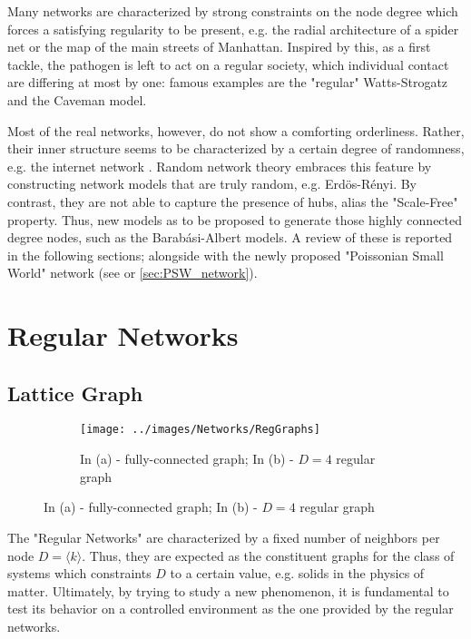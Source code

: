 \documentclass[a4paper,10pt]{book} %
\theoremstyle{definition}
\begin{document}
Many networks are characterized by strong constraints on the node degree which forces a satisfying regularity to be present, e.g. the radial architecture of a spider net or the map of the main streets of Manhattan.
Inspired by this, as a first tackle, the pathogen is left to act on a regular society, which individual contact are differing at most by one: famous examples are the "regular" Watts-Strogatz and the Caveman model.

Most of the real networks, however, do not show a comforting orderliness. 
Rather, their inner structure seems to be characterized by a certain degree of randomness, e.g. the internet network \cite{barabasi::2016networkbook}. Random network theory embraces this feature by constructing network models that are truly random, e.g. Erdös-Rényi. By contrast, they are not able to capture the presence of hubs, alias the "Scale-Free" property. Thus, new models as to be proposed to generate those highly connected degree nodes, such as the Barabási-Albert models.
A review of these is reported in the following sections; alongside with the newly proposed "Poissonian Small World" network (see \cite{Thurner::NetBasedExpl} or \autoref{sec:PSW_network}).

\section{Regular Networks}
\label{sec:RLN-Caveman_Description}
\subsection{Lattice Graph}
\begin{figure}[ht]
    \begin{subfigure}{\textwidth}
        \texttt{[image: ../images/Networks/RegGraphs]}
        \centering
        \caption{In (a) - fully-connected graph; In (b) - $D = 4$ regular graph \cite{Zelazo:2011_RSensNet_images}}
        \label{fig:RegGraph}
    \end{subfigure}
\end{figure}

The "Regular Networks" are characterized by a fixed number of neighbors per node $D = \langle k \rangle$. Thus, they are expected as the constituent graphs for the class of systems which constraints $D$ to a certain value, e.g. solids in the physics of matter.
Ultimately, by trying to study a new phenomenon, it is fundamental to test its behavior on a controlled environment as the one provided by the regular networks.
\end{document}
